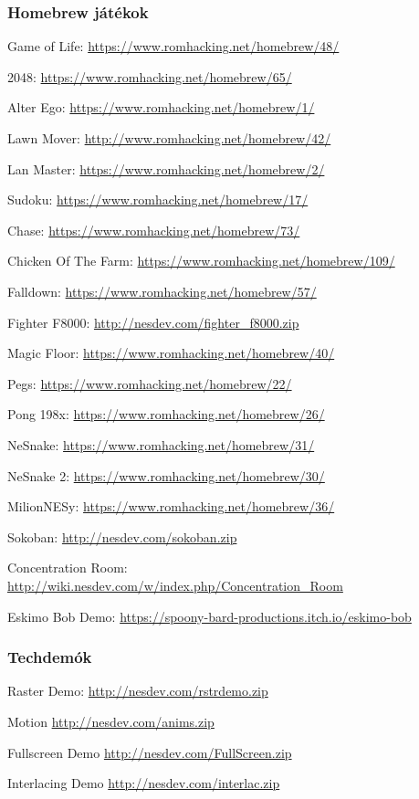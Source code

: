 \subsubsection{Homebrew játékok}
\begin{compactitem}
	\item Game of Life: \url{https://www.romhacking.net/homebrew/48/}
	\item 2048: \url{https://www.romhacking.net/homebrew/65/}
	\item Alter Ego: \url{https://www.romhacking.net/homebrew/1/} \label{alter}
	\item Lawn Mover: \url{http://www.romhacking.net/homebrew/42/} \label{lawn}
	\item Lan Master: \url{https://www.romhacking.net/homebrew/2/}
	\item Sudoku: \url{https://www.romhacking.net/homebrew/17/}
	\item Chase: \url{https://www.romhacking.net/homebrew/73/}
	\item Chicken Of The Farm: \url{https://www.romhacking.net/homebrew/109/}
	\item Falldown: \url{https://www.romhacking.net/homebrew/57/}
	\item Fighter F8000: \url{http://nesdev.com/fighter\_f8000.zip}
	\item Magic Floor: \url{https://www.romhacking.net/homebrew/40/}
	\item Pegs: \url{https://www.romhacking.net/homebrew/22/}
	\item Pong 198x: \url{https://www.romhacking.net/homebrew/26/}
	\item NeSnake: \url{https://www.romhacking.net/homebrew/31/}
	\item NeSnake 2: \url{https://www.romhacking.net/homebrew/30/}
	\item MilionNESy: \url{https://www.romhacking.net/homebrew/36/}
	\item Sokoban: \url{http://nesdev.com/sokoban.zip}
	\item Concentration Room: \newline \url{http://wiki.nesdev.com/w/index.php/Concentration_Room}
	\item Eskimo Bob Demo: \newline \url{https://spoony-bard-productions.itch.io/eskimo-bob}
\end{compactitem}

\subsubsection{Techdemók}
\begin{compactitem}
	\item Raster Demo: \url{http://nesdev.com/rstrdemo.zip}
	\item Motion \url{http://nesdev.com/anims.zip}
	\item Fullscreen Demo \url{http://nesdev.com/FullScreen.zip}
	\item Interlacing Demo \url{http://nesdev.com/interlac.zip}
\end{compactitem}



